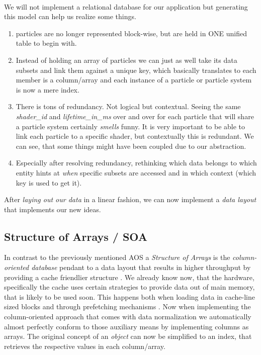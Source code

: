 \\
We will not implement a relational database for our application but generating this model can help us realize some things.
\begin{enumerate}
	\item particles are no longer represented block-wise, but are held in ONE unified table to begin with.
	\item Instead of holding an array of particles we can just as well take its data subsets and link them against a unique key, which basically translates to each member is a column/array and each instance of a particle or particle system is now a mere index.
	\item There is tons of redundancy. Not logical but contextual. Seeing the same \textit{shader\_id} and \textit{lifetime\_in\_ms} over and over for each particle that will share a particle system certainly \textit{smells} funny. It is very important to be able to link each particle to a specific shader, but contextually this is redundant. We can see, that some things might have been coupled due to our abstraction.
	\item Especially after resolving redundancy, rethinking which data belongs to which entity hints at \textit{when} specific subsets are accessed and in which context (which key is used to get it).
\end{enumerate}
After \textit{laying out our data} in a linear fashion, we can now implement a \textit{data layout} that implements our new ideas.

\subsection{Structure of Arrays / SOA}\label{soa}
In contrast to the previously mentioned AOS  a \textit{Structure of Arrays} is the \textit{column-oriented database} pendant to a data layout that results in higher throughput by providing a cache friendlier structure . We already know now, that the hardware, specifically the cache uses certain strategies to provide data out of main memory, that is likely to be used soon. This happens both when loading data in cache-line sized blocks and through prefetching mechanisms . Now when implementing the column-oriented approach that comes with data normalization we automatically almost perfectly conform to those auxiliary means by implementing columns as arrays. The original concept of an \textit{object} can now be simplified to an index, that retrieves the respective values in each column/array.

